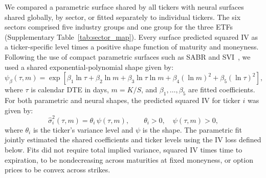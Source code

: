 We compared a parametric surface shared by all tickers with neural surfaces shared globally, by sector, or fitted separately to individual tickers. The six sectors comprised five industry groups and one group for the three ETFs (Supplementary Table~\ref{tab:sector_map}). Every surface predicted squared IV as a ticker-specific level times a positive shape function of maturity and moneyness. Following the use of compact parametric surfaces such as SABR and SVI~\cite{hagan2002,gatheral2004}, we used a shared exponential-polynomial shape given by:
\begin{equation}\label{eq:psi}
 \psi_{\beta}(\tau,m)=\exp\!\left[
 \beta_1\ln\tau+\beta_2\ln m+\beta_3\ln\tau\ln m
 +\beta_4(\ln m)^2+\beta_5(\ln\tau)^2\right],
\end{equation}
where $\tau$ is calendar DTE in days, $m=K/S$, and $\beta_1,\ldots,\beta_5$ are fitted coefficients. For both parametric and neural shapes, the predicted squared IV for ticker $i$ was given by:
\begin{equation}\label{eq:sigma_model}
    \widehat\sigma_i^2(\tau,m)=\theta_i\,\psi(\tau,m),
    \qquad \theta_i>0,\quad \psi(\tau,m)>0,
\end{equation}
where $\theta_i$ is the ticker's variance level and $\psi$ is the shape. The parametric fit jointly estimated the shared coefficients and ticker levels using the IV loss defined below. Fits did not require total implied variance, squared IV times time to expiration, to be nondecreasing across maturities at fixed moneyness, or option prices to be convex across strikes.

